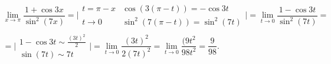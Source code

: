 \documentclass[12pt]{article}
\begin{document}
$$
\begin{array}{l}
\lim\limits_{x\rightarrow \pi}\dfrac{1+\cos{3x}}{\sin^2(7x)} = 
\biggl|
\begin{array}{ll}
t = \pi - x & \cos(3(\pi-t)) = -\cos{3t}	\\ 
t\rightarrow0 & \sin^2(7(\pi-t)) = \sin^2(7t)
\end{array}
\biggr| =
\lim\limits_{t\rightarrow 0}\dfrac{1-\cos{3t}}{\sin^2(7t)} = \\
= \biggl|
\begin{array}{l}
1-\cos{3t} \sim \frac{(3t)^2}{2}	\\ 
\sin(7t) \sim 7t
\end{array}
\biggr| =
\lim\limits_{t\rightarrow 0}\dfrac{(3t)^2}{2(7t)^2} = 
\lim\limits_{t\rightarrow 0}\dfrac{(9t^2}{98t^2} = \dfrac{9}{98}.
\end{array}
$$


\end{document}
